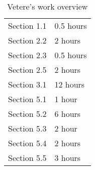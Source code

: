 \begin{table} [H]
\centering
{}
{\centering
\begin{tabular}{m{2.5in}|m{.9in}}
Section 1.1 & 0.5 hours\\
Section 2.2 & 2 hours\\
Section 2.3 & 0.5 hours\\
Section 2.5 & 2 hours\\
Section 3.1 & 12 hours\\
Section 5.1 & 1 hour\\
Section 5.2 & 6 hours\\
Section 5.3 & 2 hour\\
Section 5.4 & 2 hours\\
Section 5.5 & 3 hours\\
\end{tabular}
}
\caption{Vetere's work overview}
\end{table}

